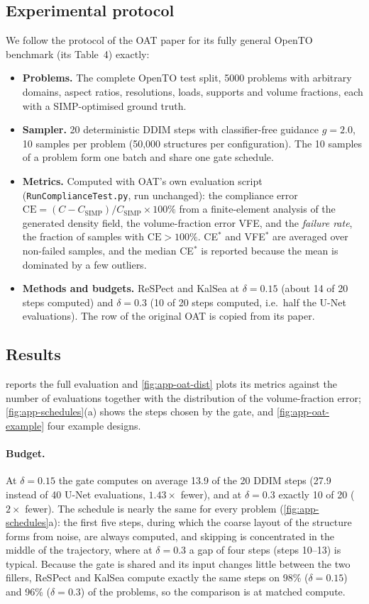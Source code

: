 \subsection{Experimental protocol}
We follow the protocol of the OAT paper for its fully general OpenTO benchmark (its Table~4) exactly:
\begin{itemize}
  \item \textbf{Problems.} The complete OpenTO test split, 5000 problems with arbitrary domains, aspect ratios, resolutions, loads, supports and volume fractions, each with a SIMP-optimised ground truth.
  \item \textbf{Sampler.} 20 deterministic DDIM steps with classifier-free guidance $g=2.0$, 10 samples per problem (50{,}000 structures per configuration). The 10 samples of a problem form one batch and share one gate schedule.
  \item \textbf{Metrics.} Computed with OAT's own evaluation script (\texttt{RunComplianceTest.py}, run unchanged): the compliance error $\mathrm{CE} = (C - C_{\mathrm{SIMP}})/C_{\mathrm{SIMP}}\times100\%$ from a finite-element analysis of the generated density field, the volume-fraction error VFE, and the \emph{failure rate}, the fraction of samples with $\mathrm{CE}>100\%$. CE$^*$ and VFE$^*$ are averaged over non-failed samples, and the median CE$^*$ is reported because the mean is dominated by a few outliers.
  \item \textbf{Methods and budgets.} ReSPect and KalSea at $\delta=0.15$ (about 14 of 20 steps computed) and $\delta=0.3$ (10 of 20 steps computed, i.e.\ half the U-Net evaluations). The row of the original OAT is copied from its paper.
\end{itemize}

\subsection{Results}
 reports the full evaluation and \cref{fig:app-oat-dist} plots its metrics against the number of evaluations together with the distribution of the volume-fraction error; \cref{fig:app-schedules}(a) shows the steps chosen by the gate, and \cref{fig:app-oat-example} four example designs.

\paragraph{Budget.} At $\delta=0.15$ the gate computes on average 13.9 of the 20 DDIM steps (27.9 instead of 40 U-Net evaluations, $1.43\times$ fewer), and at $\delta=0.3$ exactly 10 of 20 ($2\times$ fewer). The schedule is nearly the same for every problem (\cref{fig:app-schedules}a): the first five steps, during which the coarse layout of the structure forms from noise, are always computed, and skipping is concentrated in the middle of the trajectory, where at $\delta=0.3$ a gap of four steps (steps 10--13) is typical. Because the gate is shared and its input changes little between the two fillers, ReSPect and KalSea compute exactly the same steps on 98\% ($\delta=0.15$) and 96\% ($\delta=0.3$) of the problems, so the comparison is at matched compute.

